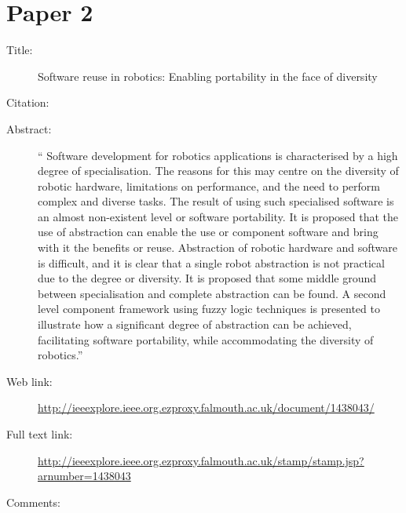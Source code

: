 \documentclass{scrartcl}
\begin{document}
\section*{Paper 2}
\begin{description}
\item[Title:] Software reuse in robotics: Enabling portability in the face of diversity
\item[Citation:] \cite{Smith}
\item[Abstract:]`` Software development for robotics applications is characterised by a high degree of specialisation. The reasons for this may centre on the diversity of robotic hardware, limitations on performance, and the need to perform complex and diverse tasks. The result of using such specialised software is an almost non-existent level or software portability. It is proposed that the use of abstraction can enable the use or component software and bring with it the benefits or reuse. Abstraction of robotic hardware and software is difficult, and it is clear that a single robot abstraction is not practical due to the degree or diversity. It is proposed that some middle ground between specialisation and complete abstraction can be found. A second level component framework using fuzzy logic techniques is presented to illustrate how a significant degree of abstraction can be achieved, facilitating software portability, while accommodating the diversity of robotics.''
\item[Web link:]\url{http://ieeexplore.ieee.org.ezproxy.falmouth.ac.uk/document/1438043/}
\item[Full text link:] \url{http://ieeexplore.ieee.org.ezproxy.falmouth.ac.uk/stamp/stamp.jsp?arnumber=1438043}
\item[Comments:] 
\end{description}
\end{document}

